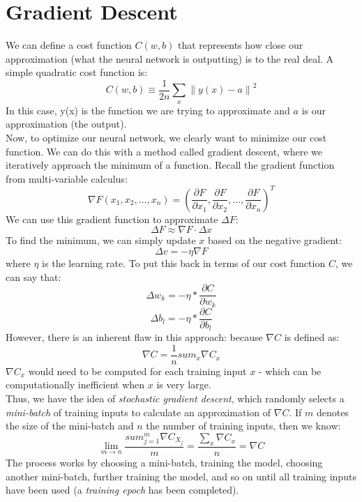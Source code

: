\documentclass{article}
\newcommand{\norm}[1]{\left\lVert#1\right\rVert}
\begin{document}
\section{Gradient Descent}
	We can define a cost function $C(w, b)$ that represents how close our approximation (what the neural network is outputting) is to the real deal. A simple quadratic cost function is: 
	\begin{equation}
		C(w, b) \equiv \frac{1}{2n} \sum_{x} \norm{y(x) - a}^2
	\end{equation}
	In this case, y(x) is the function we are trying to approximate and $a$ is our approximation (the output). \\
	Now, to optimize our neural network, we clearly want to minimize our cost function. We can do this with a method called gradient descent, where we iteratively approach the minimum of a function. Recall the gradient function from multi-variable calculus:
	\begin{equation}
		\nabla F(x_1, x_2, \dots, x_n) = (\frac{\partial F}{\partial x_1}, \frac{\partial F}{\partial x_2}, \dots, \frac{\partial F}{\partial x_n})^{T}
	\end{equation}
	We can use this gradient function to approximate $\Delta F$:
	\begin{equation}
		\Delta F \approx \nabla F \cdot \Delta x
	\end{equation}
	To find the minimum, we can simply update $x$ based on the negative gradient:
	\begin{equation}
		\Delta v = -\eta \nabla F
	\end{equation}
	where $\eta$ is the learning rate. To put this back in terms of our cost function $C$, we can say that: \\
	\begin{equation}
		\Delta w_k = -\eta * \frac{\partial C}{\partial w_k}
	\end{equation}
	\begin{equation}
		\Delta b_l = -\eta * \frac{\partial C}{\partial b_l}
	\end{equation}
	However, there is an inherent flaw in this approach: because $\nabla C$ is defined as:
	\begin{equation*}
		\nabla C = \frac{1}{n} sum_{x} \nabla C_x
	\end{equation*}
	$\nabla C_x$ would need to be computed for each training input $x$ - which can be computationally inefficient when $x$ is very large. \\
	Thus, we have the idea of \textit{stochastic gradient descent}, which randomly selects a \textit{mini-batch} of training inputs to calculate an approximation of $\nabla C$. If $m$ denotes the size of the mini-batch and $n$ the number of training inputs, then we know:
	\begin{equation}
		\lim_{m \to n} \frac{sum_{j=1}^{m} \nabla C_{X_j}}{m} = \frac{\sum_x \nabla C_x}{n} = \nabla C
	\end{equation}
	The process works by choosing a mini-batch, training the model, choosing another mini-batch, further training the model, and so on until all training inputs have been used (a \textit{training epoch} has been completed). 
\end{document}
